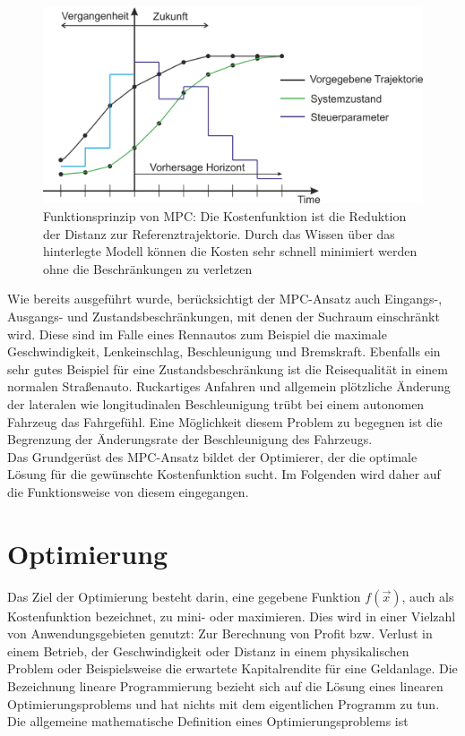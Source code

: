 \documentclass{like}
\begin{document}
\begin{figure}[ht!]
	\centering
	\includegraphics[width=400pt]{Abbildungen/mpcParadigm.png}
	\caption{Funktionsprinzip von \ac{MPC}: Die Kostenfunktion ist die Reduktion der Distanz zur Referenztrajektorie. Durch das Wissen über das hinterlegte Modell können die Kosten sehr schnell minimiert werden ohne die Beschränkungen zu verletzen}
	\label{fig:mpcTheory}
\end{figure}

Wie bereits ausgeführt wurde, berücksichtigt der \ac{MPC}-Ansatz auch Eingangs-, Ausgangs- und Zustandsbeschränkungen, mit denen der Suchraum einschränkt wird. Diese sind im Falle eines Rennautos zum Beispiel die maximale Geschwindigkeit, Lenkeinschlag, Beschleunigung und Bremskraft. Ebenfalls ein sehr gutes Beispiel für eine Zustandsbeschränkung ist die Reisequalität in einem normalen Straßenauto. Ruckartiges Anfahren und allgemein plötzliche Änderung der lateralen wie longitudinalen Beschleunigung trübt bei einem autonomen Fahrzeug das Fahrgefühl. Eine Möglichkeit diesem Problem zu begegnen ist die Begrenzung der Änderungsrate der Beschleunigung des Fahrzeugs.\\

Das Grundgerüst des \ac{MPC}-Ansatz bildet der Optimierer, der die optimale Lösung für die gewünschte Kostenfunktion sucht. Im Folgenden wird daher auf die Funktionsweise von diesem eingegangen.


\section{Optimierung}
Das Ziel der Optimierung besteht darin, eine gegebene Funktion \(f(\vec{x})\), auch als Kostenfunktion bezeichnet, zu mini- oder maximieren. 
Dies wird in einer Vielzahl von Anwendungsgebieten genutzt:
Zur Berechnung von Profit bzw. Verlust in einem Betrieb, der Geschwindigkeit oder Distanz in einem physikalischen Problem oder Beispielsweise die erwartete Kapitalrendite für eine Geldanlage.  
Die Bezeichnung lineare Programmierung bezieht sich auf die Lösung eines linearen  Optimierungsproblems und hat nichts mit dem eigentlichen Programm zu tun. 
Die allgemeine mathematische Definition eines Optimierungsproblems ist
\end{document}
